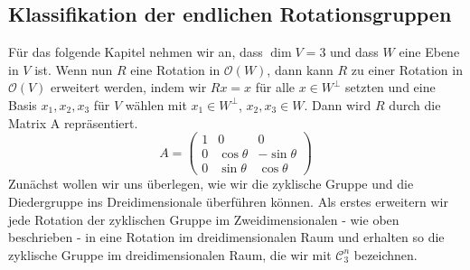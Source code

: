 \subsection{Klassifikation der endlichen Rotationsgruppen}
Für das folgende Kapitel nehmen wir an, dass $\dim V = 3$ und dass $W$ eine Ebene in $V$ ist. Wenn nun $R$ eine Rotation in $\mathcal{O}(W)$, dann kann $R$ zu einer Rotation in $\mathcal{O}(V)$ erweitert werden, indem wir $Rx=x$ für alle $x \in W^\perp$ setzten und eine Basis ${x_1,x_2,x_3}$ für $V$ wählen mit $x_1 \in W^\perp$, $x_2, x_3 \in W$. Dann wird $R$ durch die Matrix A repräsentiert.
$$A=\begin{pmatrix}
1 & 0 & 0 \\
0 & \cos{\theta} & -\sin{\theta} \\
0 & \sin{\theta} & \cos{\theta}
\end{pmatrix} $$ 
Zunächst wollen wir uns überlegen, wie wir die zyklische Gruppe und die Diedergruppe ins Dreidimensionale überführen können. Als erstes erweitern wir jede Rotation der zyklischen Gruppe im Zweidimensionalen - wie oben beschrieben - in eine Rotation im dreidimensionalen Raum und erhalten so die zyklische Gruppe im dreidimensionalen Raum, die wir mit $\mathcal{C}_3^n$ bezeichnen. 

